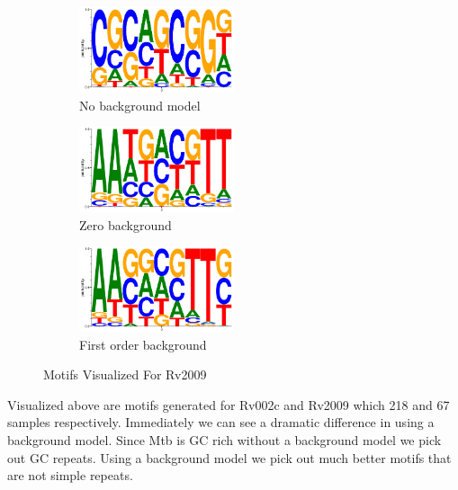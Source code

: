 \documentclass[12pt]{scrartcl} %
\begin{document}
\begin{figure}
    \centering
        \begin{subfigure}{.4\textwidth}
    
        \includegraphics[width=0.5\textwidth]{Pictures/rv2009_no_bg.png}
        \caption{No background model}
    \end{subfigure}%
        \begin{subfigure}{.4\textwidth}
       
        \includegraphics[width=0.5\textwidth]{Pictures/rv2009_zero_bg.png}
            \caption{Zero background}
    \end{subfigure}%
        \begin{subfigure}{.4\textwidth}
        
          \includegraphics[width=0.5\textwidth]{Pictures/rv2009_one_bg.png}
            \caption{First order background}
        \end{subfigure}%
         \caption{Motifs Visualized For Rv2009}
    \end{figure}

Visualized above are motifs generated for Rv002c and Rv2009 which 218 and 67 samples
respectively. Immediately we can see a dramatic difference in using a background model. Since
Mtb is GC rich without a background model we pick out GC repeats. Using a background model we pick out 
much better motifs that are not simple repeats. 
\end{document}
